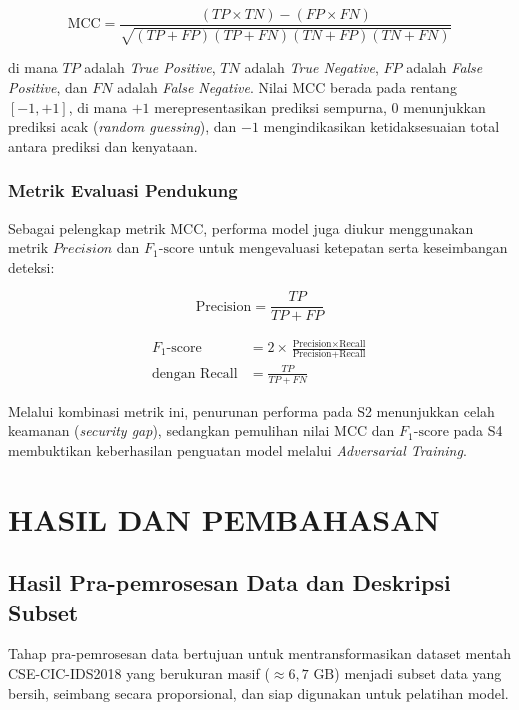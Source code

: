 \documentclass[11pt, a4paper]{article}
\begin{document}
\begin{equation}
\text{MCC} = \frac{(TP \times TN) - (FP \times FN)}{\sqrt{(TP + FP)(TP + FN)(TN + FP)(TN + FN)}}
\end{equation}

di mana $TP$ adalah \textit{True Positive}, $TN$ adalah \textit{True Negative}, $FP$ adalah \textit{False Positive}, dan $FN$ adalah \textit{False Negative}. Nilai MCC berada pada rentang $[-1, +1]$, di mana $+1$ merepresentasikan prediksi sempurna, $0$ menunjukkan prediksi acak (\textit{random guessing}), dan $-1$ mengindikasikan ketidaksesuaian total antara prediksi dan kenyataan.

\subsubsection{Metrik Evaluasi Pendukung}
Sebagai pelengkap metrik MCC, performa model juga diukur menggunakan metrik $Precision$ dan $F_1\text{-score}$ untuk mengevaluasi ketepatan serta keseimbangan deteksi:

\begin{equation}
\text{Precision} = \frac{TP}{TP + FP}
\end{equation}

\begin{align}
F_1\text{-score} &= 2 \times \frac{\text{Precision} \times \text{Recall}}{\text{Precision} + \text{Recall}} \\[6pt]
\text{dengan } \text{Recall} &= \frac{TP}{TP + FN}
\end{align}

Melalui kombinasi metrik ini, penurunan performa pada S2 menunjukkan celah keamanan (\textit{security gap}), sedangkan pemulihan nilai MCC dan $F_1\text{-score}$ pada S4 membuktikan keberhasilan penguatan model melalui \textit{Adversarial Training}.



\section{HASIL DAN PEMBAHASAN}


\subsection{Hasil Pra-pemrosesan Data dan Deskripsi Subset}
Tahap pra-pemrosesan data bertujuan untuk mentransformasikan dataset mentah CSE-CIC-IDS2018 yang berukuran masif ($\approx 6{,}7\text{ GB}$) menjadi subset data yang bersih, seimbang secara proporsional, dan siap digunakan untuk pelatihan model.
\end{document}
